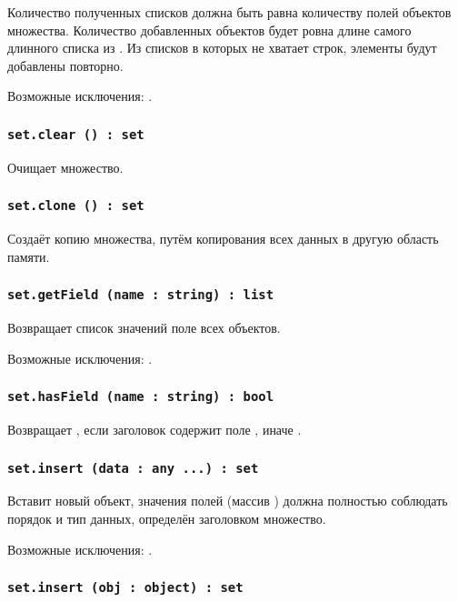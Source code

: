 Количество полученных списков должна быть равна количеству полей объектов множества. Количество добавленных объектов будет ровна длине самого длинного списка из . Из списков в которых не хватает строк, элементы будут добавлены повторно.

Возможные исключения: .

\subsubsection{\lstinline|set.clear () : set|}

Очищает множество.

\subsubsection{\lstinline|set.clone () : set|}

Создаёт копию множества, путём копирования всех данных в другую область памяти.

\subsubsection{\lstinline|set.getField (name : string) : list|}

Возвращает список значений поле  всех объектов.

Возможные исключения: .

\subsubsection{\lstinline|set.hasField (name : string) : bool|}

Возвращает \true, если заголовок содержит поле , иначе \false.

\subsubsection{\lstinline|set.insert (data : any ...) : set|}

Вставит новый объект, значения полей (массив ) должна полностью соблюдать порядок и тип данных, определён заголовком множество.

Возможные исключения: .

\subsubsection{\lstinline|set.insert (obj : object) : set|}

